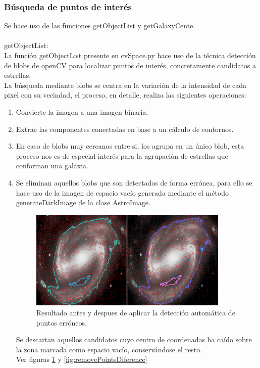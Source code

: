 	\subsubsection{Búsqueda de puntos de interés}
	Se hace uso de las funciones getObjectList y getGalaxyCente.\\ \\
	{\large getObjectList}: \\
	La función getObjectList presente en cvSpace.py hace uso de la técnica detección de blobs de openCV para localizar puntos de interés, concretamente candidatos a estrellas.\\
	La búsqueda mediante blobs se centra en la variación de la intensidad de cada pixel con su vecindad, el proceso, en detalle, realiza las siguientes operaciones:
	\begin{enumerate}
		\item Convierte la imagen a una imagen binaria.
		\item Extrae las componentes conectadas en base a un cálculo de contornos.
		\item En caso de blobs muy cercanos entre si, los agrupa en un único blob, esta proceso nos es de especial interés para la agrupación de estrellas que conforman una galaxia.
		\item Se eliminan aquellos blobs que son detectados de forma errónea, para ello se hace uso de la imagen de espacio vacío generada mediante el método {\large generateDarkImage} de la clase AstroImage.\\
		\begin{figure}[!htb]
			\centering
			\includegraphics[width=0.9\textwidth]{images/removeBadPointsComparation.PNG}
			\caption{\label{fig:removePointsConparation}Resultado antes y despues de aplicar la detección automática de puntos erróneos.}
		\end{figure}
		Se descartan aquellos candidatos cuyo centro de coordenadas ha caído sobre la zona marcada como espacio vacío, conservándose el resto.\\ Ver figuras  \ref{fig:removePointsConparation} y \ref{fig:removePointsDiference}

\end{enumerate}
